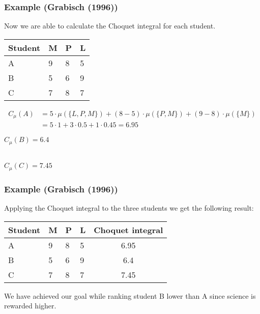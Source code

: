 \documentclass[envcountsect]{beamer}
\begin{document}
\begin{frame}
	\frametitle{Example (Grabisch (1996))}

Now we are able to calculate the Choquet integral for each student.

\begin{table}[]
\begin{tabular}{llll}
\hline
Student  & M & P & L \\
 \hline
 A & 9 & 8 & 5 \\
 B & 5 & 6 & 9 \\
 C & 7 & 8 & 7 \\
 \hline
\end{tabular}
\end{table}
	\begin{align*}
		C_\mu(A) &= 5\cdot\mu(\{L,P,M\}) + (8-5)\cdot\mu(\{P,M\}) + (9-8)\cdot\mu(\{M\}) \\
		&= 5\cdot1+3\cdot0.5 + 1\cdot0.45 = 6.95
	\end{align*}

	$C_\mu(B) = 6.4 $\\ ~

	$C_\mu(C) = 7.45 $\\






\end{frame}
\begin{frame}

	\frametitle{Example (Grabisch (1996))}
Applying the Choquet integral to the three students we get the following result: \\

\begin{table}[]
\begin{tabular}{llllc}
\hline
Student  & M & P & L & Choquet integral \\
 \hline
 A & 9 & 8 & 5 &  6.95\\
 B & 5 & 6 & 9 &  6.4\\
 C & 7 & 8 & 7 &  7.45\\
 \hline
\end{tabular}
\end{table}
We have achieved our goal while ranking student B lower than A since science is rewarded higher.

\end{frame}
\end{document}
